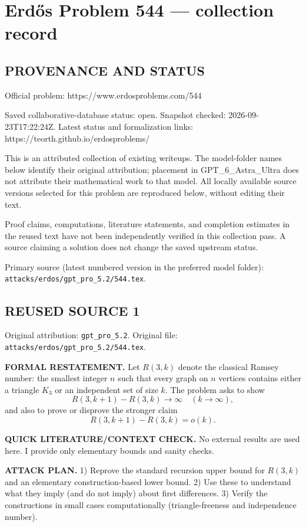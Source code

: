 \section*{Erd\H{o}s Problem 544 --- collection record}

\subsection*{PROVENANCE AND STATUS}
Official problem: https://www.erdosproblems.com/544

Saved collaborative-database status: open.
Snapshot checked: 2026-09-23T17:22:24Z.
Latest status and formalization links: https://teorth.github.io/erdosproblems/

This is an attributed collection of existing writeups. The model-folder names below identify their original attribution; placement in GPT\_6\_Astra\_Ultra does not attribute their mathematical work to that model. All locally available source versions selected for this problem are reproduced below, without editing their text.

Proof claims, computations, literature statements, and completion estimates in the reused text have not been independently verified in this collection pass. A source claiming a solution does not change the saved upstream status.

Primary source (latest numbered version in the preferred model folder): \texttt{attacks/erdos/gpt\_pro\_5.2/544.tex}.

\subsection*{REUSED SOURCE 1}
Original attribution: \texttt{gpt\_pro\_5.2}.
Original file: \texttt{attacks/erdos/gpt\_pro\_5.2/544.tex}.


\noindent\textbf{FORMAL RESTATEMENT.}
Let $R(3,k)$ denote the classical Ramsey number: the smallest integer $n$ such that every graph on $n$ vertices contains either a triangle $K_3$ or an independent set of size $k$.
The problem asks to show
\[
R(3,k+1)-R(3,k)\to\infty\quad (k\to\infty),
\]
and also to prove or disprove the stronger claim
\[
R(3,k+1)-R(3,k)=o(k).
\]

\noindent\textbf{QUICK LITERATURE/CONTEXT CHECK.}
No external results are used here. I provide only elementary bounds and sanity checks.

\noindent\textbf{ATTACK PLAN.}
1) Reprove the standard recursion upper bound for $R(3,k)$ and an elementary construction-based lower bound.
2) Use these to understand what they imply (and do not imply) about first differences.
3) Verify the constructions in small cases computationally (triangle-freeness and independence number).

